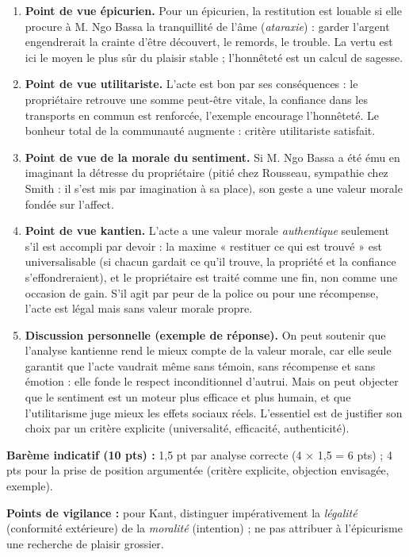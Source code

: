 \documentclass[11pt]{article}
\begin{document}
\begin{corrige}
\begin{enumerate}
\item \textbf{Point de vue épicurien.} Pour un épicurien, la restitution est louable si elle procure à M. Ngo Bassa la tranquillité de l'âme (\emph{ataraxie}) : garder l'argent engendrerait la crainte d'être découvert, le remords, le trouble. La vertu est ici le moyen le plus sûr du plaisir stable ; l'honnêteté est un calcul de sagesse.
\item \textbf{Point de vue utilitariste.} L'acte est bon par ses conséquences : le propriétaire retrouve une somme peut-être vitale, la confiance dans les transports en commun est renforcée, l'exemple encourage l'honnêteté. Le bonheur total de la communauté augmente : critère utilitariste satisfait.
\item \textbf{Point de vue de la morale du sentiment.} Si M. Ngo Bassa a été ému en imaginant la détresse du propriétaire (pitié chez Rousseau, sympathie chez Smith : il s'est mis par imagination à sa place), son geste a une valeur morale fondée sur l'affect.
\item \textbf{Point de vue kantien.} L'acte a une valeur morale \emph{authentique} seulement s'il est accompli par devoir : la maxime « restituer ce qui est trouvé » est universalisable (si chacun gardait ce qu'il trouve, la propriété et la confiance s'effondreraient), et le propriétaire est traité comme une fin, non comme une occasion de gain. S'il agit par peur de la police ou pour une récompense, l'acte est légal mais sans valeur morale propre.
\item \textbf{Discussion personnelle (exemple de réponse).} On peut soutenir que l'analyse kantienne rend le mieux compte de la valeur morale, car elle seule garantit que l'acte vaudrait même sans témoin, sans récompense et sans émotion : elle fonde le respect inconditionnel d'autrui. Mais on peut objecter que le sentiment est un moteur plus efficace et plus humain, et que l'utilitarisme juge mieux les effets sociaux réels. L'essentiel est de justifier son choix par un critère explicite (universalité, efficacité, authenticité).
\end{enumerate}
\par\medskip\noindent\textbf{Barème indicatif (10 pts) :} 1,5 pt par analyse correcte (4 × 1,5 = 6 pts) ; 4 pts pour la prise de position argumentée (critère explicite, objection envisagée, exemple).
\par\medskip\noindent\textbf{Points de vigilance :} pour Kant, distinguer impérativement la \emph{légalité} (conformité extérieure) de la \emph{moralité} (intention) ; ne pas attribuer à l'épicurisme une recherche de plaisir grossier.
\end{corrige}
\end{document}
